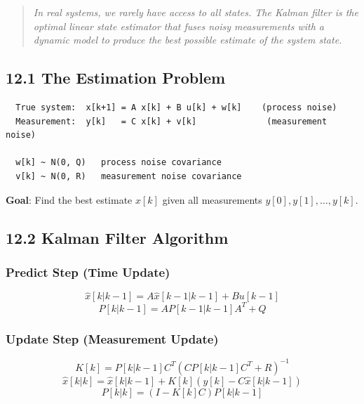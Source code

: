 \documentclass[11pt,a4paper]{book}
\begin{document}
\begin{quote}
\textit{In real systems, we rarely have access to all states. The Kalman filter is the optimal linear state estimator that fuses noisy measurements with a dynamic model to produce the best possible estimate of the system state.}
\end{quote}

\medskip\noindent\hrulefill\medskip

\subsection{12.1 The Estimation Problem}

\begin{lstlisting}
  True system:  x[k+1] = A x[k] + B u[k] + w[k]    (process noise)
  Measurement:  y[k]   = C x[k] + v[k]              (measurement noise)
  
  w[k] ~ N(0, Q)   process noise covariance
  v[k] ~ N(0, R)   measurement noise covariance
\end{lstlisting}

\textbf{Goal}: Find the best estimate $\hat{x}[k]$ given all measurements $y[0], y[1], \ldots, y[k]$.

\medskip\noindent\hrulefill\medskip

\subsection{12.2 Kalman Filter Algorithm}

\subsubsection{Predict Step (Time Update)}

\[\hat{x}[k|k-1] = A\hat{x}[k-1|k-1] + Bu[k-1]\]
\[P[k|k-1] = AP[k-1|k-1]A^T + Q\]

\subsubsection{Update Step (Measurement Update)}

\[K[k] = P[k|k-1]C^T(CP[k|k-1]C^T + R)^{-1}\]
\[\hat{x}[k|k] = \hat{x}[k|k-1] + K[k](y[k] - C\hat{x}[k|k-1])\]
\[P[k|k] = (I - K[k]C)P[k|k-1]\]
\end{document}

